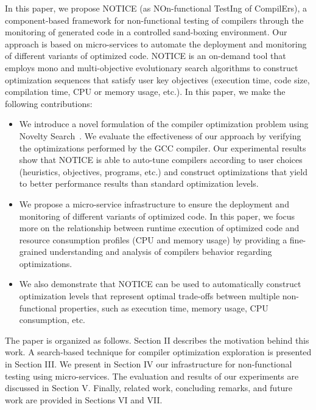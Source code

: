 In this paper, we propose NOTICE (as NOn-functional TestIng of CompilErs), a component-based framework for non-functional testing of compilers through the monitoring of generated code in a controlled sand-boxing environment. Our approach is based on micro-services to automate the deployment and monitoring of different variants of optimized code. NOTICE is an on-demand tool that employs mono and multi-objective evolutionary search algorithms to construct optimization sequences that satisfy user key objectives (execution time, code size, compilation time, CPU or memory usage, etc.).
In this paper, we make the following contributions:
\begin{itemize} 
	
	\item We introduce a novel formulation of the compiler optimization problem using Novelty Search~\cite{lehman2008exploiting}. We evaluate the effectiveness of our approach by verifying the optimizations performed by the GCC compiler.
	Our experimental results show that NOTICE is able to auto-tune compilers according to user choices (heuristics, objectives, programs, etc.) and construct optimizations that yield to better performance results than standard optimization levels.
	
	\item We propose a micro-service infrastructure to ensure the deployment and monitoring of different variants of optimized code. In this paper, we focus more on the relationship between runtime execution of optimized code and resource consumption profiles (CPU and memory usage) by providing a fine-grained understanding and analysis of compilers behavior regarding optimizations.

	\item We also demonstrate that NOTICE can be used to automatically construct optimization levels that represent optimal trade-offs between multiple non-functional properties, such as execution time, memory usage, CPU consumption, etc.
\end{itemize}


 



The paper is organized as follows. Section II describes the motivation behind this work. A search-based technique for compiler optimization exploration is presented in Section III. We present in Section IV our infrastructure for non-functional testing using micro-services. The evaluation and results of our experiments are discussed in Section V. Finally, related work, concluding remarks, and future work are provided in Sections VI and VII\@.


